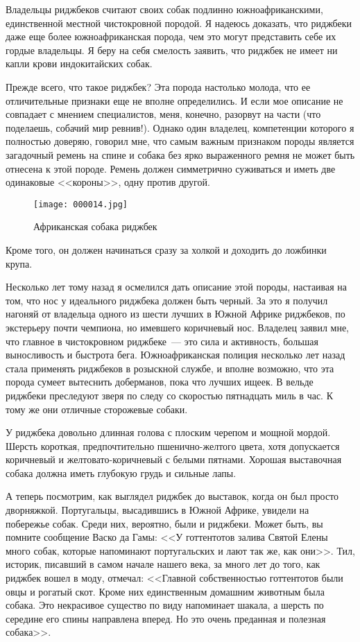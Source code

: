 \documentclass[12pt,a4paper,twoside,openany,svgnames]{memoir}
\begin{document}
Владельцы риджбеков считают своих собак подлинно южноафриканскими, единственной местной чистокровной породой. Я надеюсь доказать, что риджбеки даже еще более южноафриканская порода, чем это могут представить себе их гордые владельцы. Я беру на себя смелость заявить, что риджбек не имеет ни капли крови индокитайских собак.

Прежде всего, что такое риджбек? Эта порода настолько молода, что ее отличительные признаки еще не вполне определились. И если мое описание не совпадает с мнением специалистов, меня, конечно, разорвут на части (что поделаешь, собачий мир ревнив!). Однако один владелец, компетенции которого я полностью доверяю, говорил мне, что самым важным признаком породы является загадочный ремень на спине и собака без ярко выраженного ремня не может быть отнесена к этой породе. Ремень должен симметрично суживаться и иметь две одинаковые <<короны>>, одну против другой.

\begin{figure}[ht!]
\centering
\texttt{[image: 000014.jpg]}
\caption{Африканская собака риджбек}
\label{overflow}
\end{figure}


Кроме того, он должен начинаться сразу за холкой и доходить до ложбинки крупа.

Несколько лет тому назад я осмелился дать описание этой породы, настаивая на том, что нос у идеального риджбека должен быть черный. За это я получил нагоняй от владельца одного из шести лучших в Южной Африке риджбеков, по экстерьеру почти чемпиона, но имевшего коричневый нос. Владелец заявил мне, что главное в чистокровном риджбеке~--- это сила и активность, большая выносливость и быстрота бега. Южноафриканская полиция несколько лет назад стала применять риджбеков в розыскной службе, и вполне возможно, что эта порода сумеет вытеснить доберманов, пока что лучших ищеек. В вельде риджбеки преследуют зверя по следу со скоростью пятнадцать миль в час. К тому же они отличные сторожевые собаки.

У риджбека довольно длинная голова с плоским черепом и мощной мордой. Шерсть короткая, предпочтительно пшенично-желтого цвета, хотя допускается коричневый и желтовато-коричневый с белыми пятнами. Хорошая выставочная собака должна иметь глубокую грудь и сильные лапы.

А теперь посмотрим, как выглядел риджбек до выставок, когда он был просто дворняжкой. Португальцы, высадившись в Южной Африке, увидели на побережье собак. Среди них, вероятно, были и риджбеки. Может быть, вы помните сообщение Васко да Гамы: <<У готтентотов залива Святой Елены много собак, которые напоминают португальских и лают так же, как они>>. Тил, историк, писавший в самом начале нашего века, за много лет до того, как риджбек вошел в моду, отмечал: <<Главной собственностью готтентотов были овцы и рогатый скот. Кроме них единственным домашним животным была собака. Это некрасивое существо по виду напоминает шакала, а шерсть по середине его спины направлена вперед. Но это очень преданная и полезная собака>>.
\end{document}
